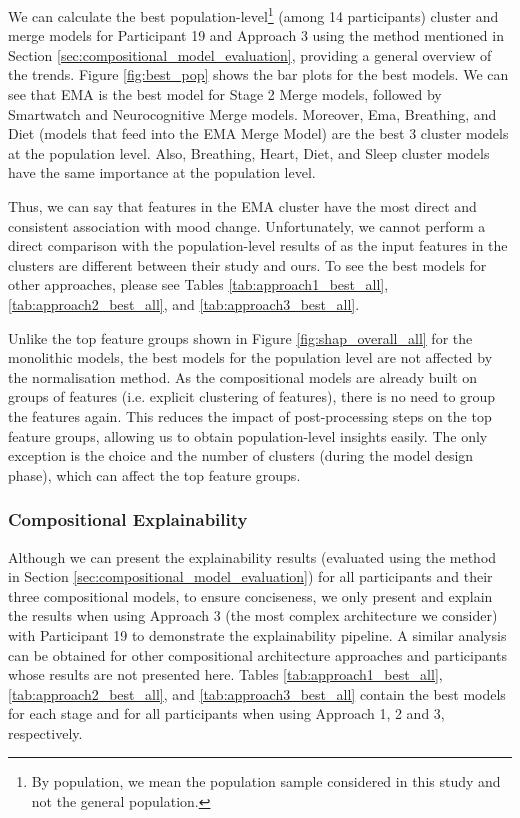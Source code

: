 We can calculate the best population-level\footnote{By population, we mean the population sample considered in this study and not the general population.} (among 14 participants) cluster and merge models for Participant 19 and Approach 3 using the method mentioned in Section \ref{sec:compositional_model_evaluation}, providing a general overview of the trends. Figure \ref{fig:best_pop} shows the bar plots for the best models. We can see that EMA is the best model for Stage 2 Merge models, followed by Smartwatch and Neurocognitive Merge models. Moreover, Ema, Breathing, and Diet (models that feed into the EMA Merge Model) are the best 3  cluster models at the population level. Also, Breathing, Heart, Diet, and Sleep cluster models have the same importance at the population level.

Thus, we can say that features in the EMA cluster have the most direct and consistent association with mood change. Unfortunately, we cannot perform a direct comparison with the population-level results of \cite{shah_personalized_2021} as the input features in the clusters are different between their study and ours. To see the best models for other approaches, please see Tables \ref{tab:approach1_best_all}, \ref{tab:approach2_best_all}, and \ref{tab:approach3_best_all}. 

Unlike the top feature groups shown in Figure \ref{fig:shap_overall_all} for the monolithic models, the best models for the population level are not affected by the normalisation method. As the compositional models are already built on groups of features (i.e. explicit clustering of features), there is no need to group the features again. This reduces the impact of post-processing steps on the top feature groups, allowing us to obtain population-level insights easily. The only exception is the choice and the number of clusters (during the model design phase), which can affect the top feature groups.



\subsubsection{Compositional Explainability}

Although we can present the explainability results (evaluated using the method in Section \ref{sec:compositional_model_evaluation}) for all participants and their three compositional models, to ensure conciseness, we only present and explain the results when using Approach 3 (the most complex architecture we consider) with Participant 19 to demonstrate the explainability pipeline. A similar analysis can be obtained for other compositional architecture approaches and participants whose results are not presented here. Tables \ref{tab:approach1_best_all}, \ref{tab:approach2_best_all}, and \ref{tab:approach3_best_all} contain the best models for each stage and for all participants when using Approach 1, 2 and 3, respectively. 

